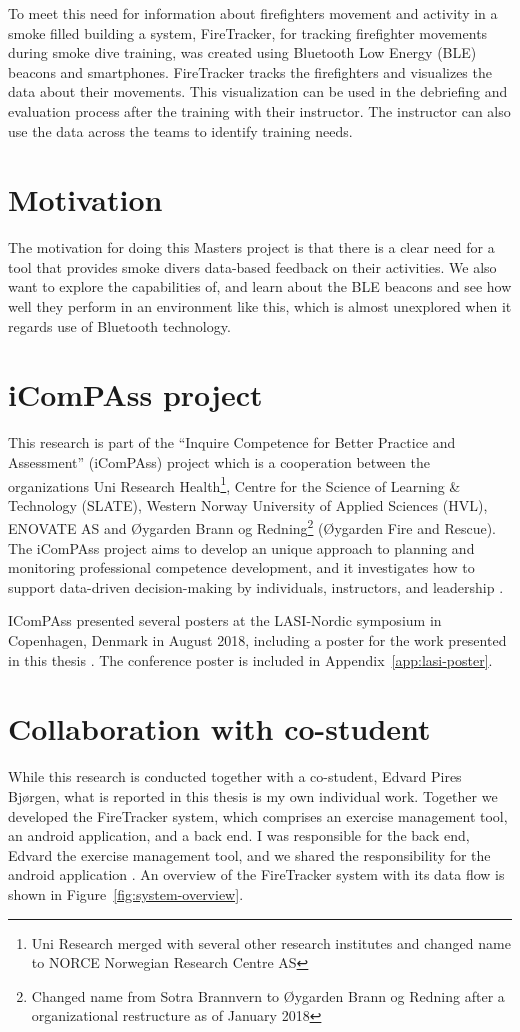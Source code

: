 \documentclass[../Main/thesis.tex]{subfiles}
\begin{document}
To meet this need for information about firefighters movement and activity in a smoke filled building a system, FireTracker, for tracking firefighter movements during smoke dive training, was created using Bluetooth Low Energy (BLE) beacons and smartphones.
FireTracker tracks the firefighters and visualizes the data about their movements. 
This visualization can be used in the debriefing and evaluation process after the training with their instructor.
The instructor can also use the data across the teams to identify training needs.

\section{Motivation}
The motivation for doing this Masters project is that there is a clear need for a tool that provides smoke divers data-based feedback on their activities.
We also want to explore the capabilities of, and learn about the BLE beacons and see how well they perform in an environment like this, which is almost unexplored when it regards use of Bluetooth technology. 

\section{iComPAss project}
This research is part of the ``Inquire Competence for Better Practice and Assessment'' (iComPAss) project which is a cooperation between the organizations Uni Research Health\footnote{Uni Research merged with several other research institutes and changed name to NORCE Norwegian Research Centre AS}, Centre for the Science of Learning \& Technology (SLATE), Western Norway University of Applied Sciences (HVL), ENOVATE AS and Øygarden Brann og Redning\footnote{Changed name from Sotra Brannvern to Øygarden Brann og Redning after a organizational restructure as of January 2018} (Øygarden Fire and Rescue).
The iComPAss project aims to develop an unique approach to planning and monitoring professional competence development, and it investigates how to support data-driven decision-making by individuals, instructors, and leadership \citep{Netteland2016}.

IComPAss presented several posters at the LASI-Nordic symposium in Copenhagen, Denmark in August 2018, including a poster for the work presented in this thesis \citep{Wake2018}. 
The conference poster is included in Appendix~\ref{app:lasi-poster}.

\section{Collaboration with co-student}
While this research is conducted together with a co-student, Edvard Pires Bjørgen, what is reported in this thesis is my own individual work.
Together we developed the FireTracker system, which comprises an exercise management tool, an android application, and a back end.
I was responsible for the back end, Edvard the exercise management tool, and we shared the responsibility for the android application \citep{Bjorgen2018}.
An overview of the FireTracker system with its data flow is shown in Figure~\ref{fig:system-overview}.
\end{document}
